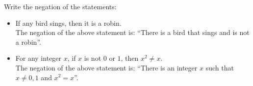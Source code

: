 \guard



\begin{exmp}
\label{exmp:negationOfUniversalConditionalStatement}
	Write the negation of the statements:
	\begin{itemize}
		\item If any bird sings, then it is a robin.\\
			The negation of the above statement is: ``There is a bird that sings and is not a robin''.
		\item For any integer $x$, if $x$ is not $0$ or $1$, then $x^2\not=x$.\\
			The negation of the above statement is: ``There is an integer $x$ such that $x\not=0,1$ and $x^2=x$''.
	\end{itemize}
\end{exmp}
